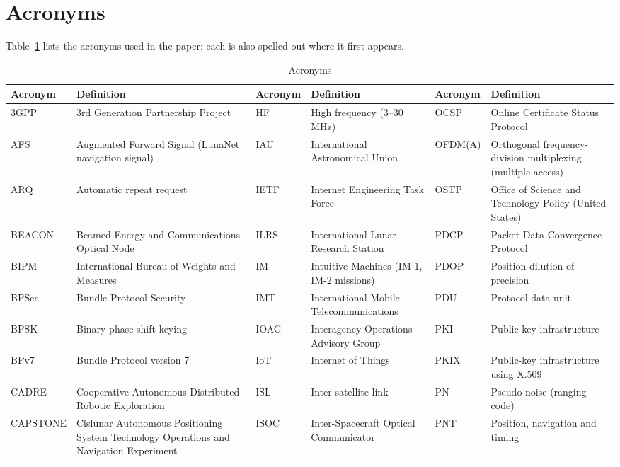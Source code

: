 \documentclass{IEEEoj}
\renewcommand{\arraystretch}{1.25}
\begin{document}
\appendices
\section{Acronyms}
\label{app:acronyms}
Table~\ref{tab:acronyms} lists the acronyms used in the paper; each is also spelled out where it first appears.
\begin{table}[!t]
\caption{Acronyms}
\label{tab:acronyms}
\centering
{}
\setlength{\aboverulesep}{0.4ex}\setlength{\belowrulesep}{0.65ex}
\scriptsize
\setlength{\tabcolsep}{3pt}
\renewcommand{\arraystretch}{1.0}
\begin{tabularx}{\textwidth}{@{}l>{\raggedright\arraybackslash}Xl>{\raggedright\arraybackslash}Xl>{\raggedright\arraybackslash}X}
\toprule
Acronym & Definition & Acronym & Definition & Acronym & Definition \\
\midrule
3GPP & 3rd Generation Partnership Project & HF & High frequency (3--30 MHz) & OCSP & Online Certificate Status Protocol \\
AFS & Augmented Forward Signal (LunaNet navigation signal) & IAU & International Astronomical Union & OFDM(A) & Orthogonal frequency-division multiplexing (multiple access) \\
ARQ & Automatic repeat request & IETF & Internet Engineering Task Force & OSTP & Office of Science and Technology Policy (United States) \\
BEACON & Beamed Energy and Communications Optical Node & ILRS & International Lunar Research Station & PDCP & Packet Data Convergence Protocol \\
BIPM & International Bureau of Weights and Measures & IM & Intuitive Machines (IM-1, IM-2 missions) & PDOP & Position dilution of precision \\
BPSec & Bundle Protocol Security & IMT & International Mobile Telecommunications & PDU & Protocol data unit \\
BPSK & Binary phase-shift keying & IOAG & Interagency Operations Advisory Group & PKI & Public-key infrastructure \\
BPv7 & Bundle Protocol version 7 & IoT & Internet of Things & PKIX & Public-key infrastructure using X.509 \\
CADRE & Cooperative Autonomous Distributed Robotic Exploration & ISL & Inter-satellite link & PN & Pseudo-noise (ranging code) \\
CAPSTONE & Cislunar Autonomous Positioning System Technology Operations and Navigation Experiment & ISOC & Inter-Spacecraft Optical Communicator & PNT & Position, navigation and timing \\

\end{tabularx}
\end{table}
\end{document}
